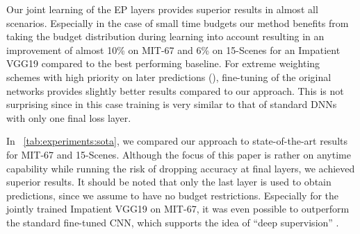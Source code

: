 \documentclass{bmvc2k}
\begin{document}
    Our joint learning of the EP layers provides superior results in almost all scenarios.
    Especially in the case of small time budgets our method benefits from taking the budget distribution during learning into account
    resulting in an improvement of almost 10\% on MIT-67 and 6\% on 15-Scenes for an Impatient VGG19 compared to the best performing baseline.
    For extreme weighting schemes with high priority on later predictions (), fine-tuning of the original networks provides slightly better results compared to our approach.
    This is not surprising since in this case training is very similar to that of standard DNNs with only one final loss layer.

    In \tablename~\ref{tab:experiments:sota}, we compared our approach to state-of-the-art results for MIT-67 and 15-Scenes.
    Although the focus of this paper is rather on anytime capability while running the risk of dropping accuracy at final layers, we achieved superior results.
    It should be noted that only the last layer is used to obtain predictions, since we assume to have no budget restrictions.
    Especially for the jointly trained Impatient VGG19 on MIT-67, it was even possible to outperform the standard fine-tuned CNN, which supports the idea of ``deep supervision'' \cite{wang2015training}.

%
%
%
%
%
%
%
%
%
%
%
%
%
%
%
%
%
%
%
%
%
%
%
%
%
%
%
%
%
%
%
%
%
%
%
%
%
%
%
%
%
%
%
%
%
%
%
%
%
%
%
\end{document}

